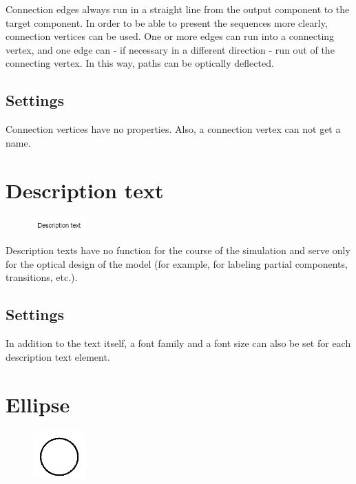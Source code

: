 Connection edges always run in a straight line from the output component
to the target component. In order to be able to present the sequences more clearly, connection vertices can be used.
One or more edges can run into a connecting vertex, and one edge can - if necessary in a different direction - run out
of the connecting vertex. In this way, paths can be optically deflected.

\subsection*{Settings}

Connection vertices have no properties. Also, a connection vertex can not get a name.


\section{Description text}
\label{ref:ModelElementText}

\begin{figure}
\vspace{-22pt}
\includegraphics[width=2cm]{imageModelElementText.png}
\vspace{-22pt}
\end{figure}

Description texts have no function for the course of the simulation
and serve only for the optical design of the model
(for example, for labeling partial components, transitions, etc.).

\subsection*{Settings}

In addition to the text itself, a font family and a font size can also be set for each description text element.


\section{Ellipse}
\label{ref:ModelElementEllipse}

\begin{figure}
\vspace{-22pt}
\includegraphics[width=2cm]{imageModelElementEllipse.png}
\vspace{-22pt}
\end{figure}

